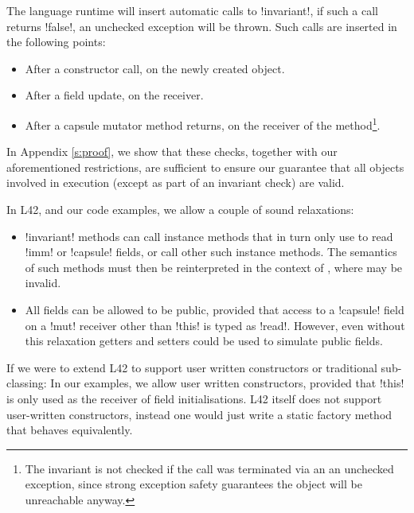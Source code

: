 The language runtime will insert automatic calls to \Q!invariant!, if such a call returns \Q!false!, an unchecked exception will be thrown. Such calls are inserted in the following points:
\SSI\begin{itemize}
	\item After a constructor call, on the newly created object.
	\item After a field update, on the receiver.
	\item After a capsule mutator method returns, on the receiver of the method\footnote{The invariant is not checked if the call was terminated via an an unchecked exception, since strong exception safety guarantees the object will be unreachable anyway.}.
\end{itemize}
\noindent In Appendix \ref{s:proof}, we show that these checks, together with our aforementioned restrictions, are sufficient to ensure our guarantee that all objects involved in execution (except as part of an invariant check) are valid.

In L42, and our code examples, we allow a couple of sound relaxations:
\SSI\begin{itemize}
	\item \Q!invariant! methods can call instance methods that in turn only use \Q@this@ to read \Q!imm! or \Q!capsule! fields, or call other such instance methods.
	The semantics of such methods must then be reinterpreted in the context of \Q@invariant@, where \Q@this@ may be invalid. 	
	\item All fields can be allowed to be public, provided that access to a \Q!capsule! field on a \Q!mut! receiver other than \Q!this! is typed as \Q!read!. However, even without this relaxation getters and setters could be used to simulate public fields.
\end{itemize}
\noindent If we were to extend L42 to support user written constructors or traditional sub-classing:
In our examples, we allow user written constructors, provided that \Q!this! is only used as the receiver of field initialisations. L42 itself does not support user-written constructors, instead one would just write a static factory method that behaves equivalently.

